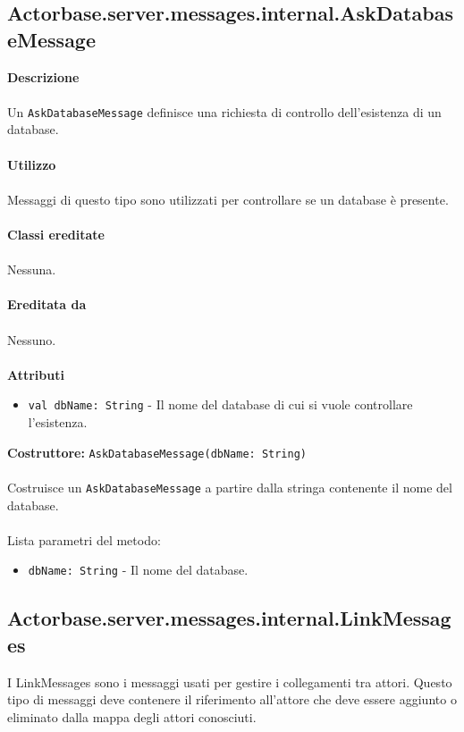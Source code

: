 \documentclass[a4paper]{article}
\begin{document}
	\subsection{Actorbase.server.messages.internal.AskDatabaseMessage}
		\textbf{Descrizione}
			\\ \\
			Un \texttt{AskDatabaseMessage} definisce una richiesta di controllo dell'esistenza di un database.
			\\ \\
		\textbf{Utilizzo}
			\\ \\
			Messaggi di questo tipo sono utilizzati per controllare se un database è presente.
			\\ \\
		\textbf{Classi ereditate}
			\\ \\
			Nessuna.
			\\ \\
		\textbf{Ereditata da}
			\\ \\
			Nessuno.
			\\ \\
		\textbf{Attributi}
			\begin{itemize}
				\item \texttt{val dbName: String} - Il nome del database di cui si vuole controllare l'esistenza.
			\end{itemize}
		\textbf{Costruttore:} \texttt{AskDatabaseMessage(dbName: String)}
		\\ \\
		Costruisce un \texttt{AskDatabaseMessage} a partire dalla stringa contenente il nome del database.
		\\ \\
		Lista parametri del metodo:
		\begin{itemize}
			\item \texttt{dbName: String} - Il nome del database.
		\end{itemize}
			
			
	\subsection{Actorbase.server.messages.internal.LinkMessages}
		I LinkMessages sono i messaggi usati per gestire i collegamenti tra attori. Questo tipo di messaggi deve contenere il riferimento all'attore che deve essere aggiunto o eliminato dalla mappa degli attori conosciuti. 
		
\end{document}
